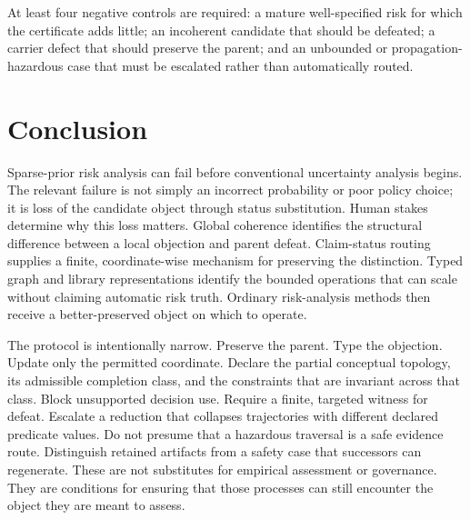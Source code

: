 \documentclass[11pt]{article}
\begin{document}
At least four negative controls are required: a mature well-specified risk for which the certificate adds little; an incoherent candidate that should be defeated; a carrier defect that should preserve the parent; and an unbounded or propagation-hazardous case that must be escalated rather than automatically routed.

\section{Conclusion}
\label{sec:conclusion}

Sparse-prior risk analysis can fail before conventional uncertainty analysis begins. The relevant failure is not simply an incorrect probability or poor policy choice; it is loss of the candidate object through status substitution. Human stakes determine why this loss matters. Global coherence identifies the structural difference between a local objection and parent defeat. Claim-status routing supplies a finite, coordinate-wise mechanism for preserving the distinction. Typed graph and library representations identify the bounded operations that can scale without claiming automatic risk truth. Ordinary risk-analysis methods then receive a better-preserved object on which to operate.

The protocol is intentionally narrow. Preserve the parent. Type the objection. Update only the permitted coordinate. Declare the partial conceptual topology, its admissible completion class, and the constraints that are invariant across that class. Block unsupported decision use. Require a finite, targeted witness for defeat. Escalate a reduction that collapses trajectories with different declared predicate values. Do not presume that a hazardous traversal is a safe evidence route. Distinguish retained artifacts from a safety case that successors can regenerate. These are not substitutes for empirical assessment or governance. They are conditions for ensuring that those processes can still encounter the object they are meant to assess.
\end{document}
